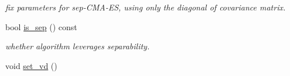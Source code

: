\begin{DoxyCompactItemize}
\begin{DoxyCompactList}\small\item\em fix parameters for sep-\/\+C\+M\+A-\/\+E\+S, using only the diagonal of covariance matrix. \end{DoxyCompactList}\item 
bool \hyperlink{classlibcmaes_1_1CMAParameters_acf7d4eeada5c0ddc16f46d8788777737}{is\+\_\+sep} () const 
\begin{DoxyCompactList}\small\item\em whether algorithm leverages separability. \end{DoxyCompactList}\item 
\hypertarget{classlibcmaes_1_1CMAParameters_a49e06e1f62b551db3bc8d8e6e21ea9c2}{void \hyperlink{classlibcmaes_1_1CMAParameters_a49e06e1f62b551db3bc8d8e6e21ea9c2}{set\+\_\+vd} ()}\label{classlibcmaes_1_1CMAParameters_a49e06e1f62b551db3bc8d8e6e21ea9c2}


\end{DoxyCompactItemize}

